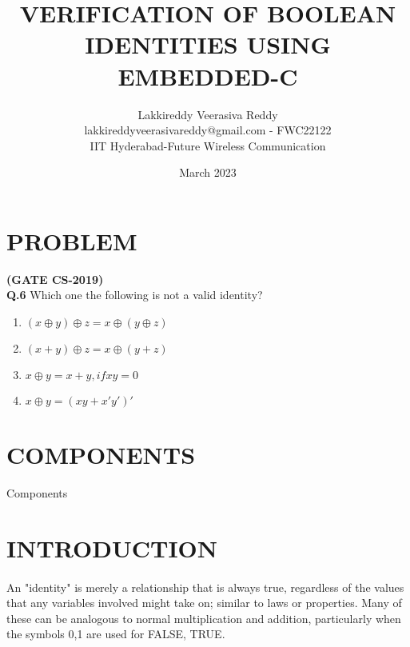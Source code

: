 \documentclass{article}
\title{VERIFICATION OF BOOLEAN IDENTITIES USING EMBEDDED-C}
\date{March 2023}
\author{Lakkireddy Veerasiva Reddy\\lakkireddyveerasivareddy@gmail.com - FWC22122\\IIT Hyderabad-Future Wireless Communication}
\date{}
\begin{document}
\maketitle
\tableofcontents
	\pagebreak
\section{PROBLEM}
\textbf{(GATE CS-2019)}\\
\textbf{Q.6} Which one the following is not a valid identity?
\begin{enumerate}[label=(\Alph*)]
	\item $ (x\oplus y)\oplus z = x\oplus (y\oplus z)$
	\item $ (x + y)\oplus z = x\oplus (y + z)$
	\item $ x\oplus y = x + y, if xy = 0$
	\item $ x\oplus y = (xy + x'y')'$
\end{enumerate}
\bigskip

\section{COMPONENTS}

\begin{table}[h]
\centering

\caption{Components}
\label{table:Components}
\end{table}
\vspace{5mm}

\section{INTRODUCTION}
\paragraph{}
	An "identity" is merely a relationship that is always true, regardless of the values that any variables involved might take on; similar to laws or properties. Many of these can be analogous to normal multiplication and addition, particularly when the symbols {0,1} are used for {FALSE, TRUE}. 
\bigskip 
\end{document}
